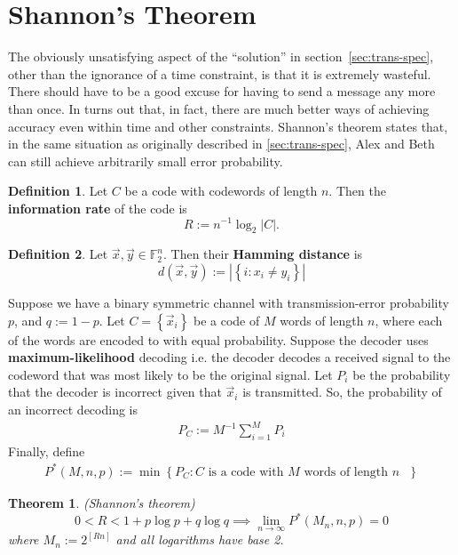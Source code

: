\documentclass{article}
\renewcommand{\tt}[1]{\text{ #1 }}
\newcommand{\F}{\mathbb{F}}
\renewcommand{\=}{\equiv}
\renewcommand{\i}{^{-1}}
\newcommand{\ra}{\rightarrow}
\newcommand{\set}[1]{\left\{ #1 \right\}}
\renewcommand{\v}{\vec}
\newcommand{\x}{{\v x}}
\newcommand{\y}{{\v y}}
\theoremstyle{plain}
\newtheorem{thm}{Theorem}[subsection]
\theoremstyle{definition}
\newtheorem{defn}{Definition}[subsection]
\begin{document}
\section{Shannon's Theorem}

The obviously unsatisfying aspect of the ``solution'' in section~\ref{sec:trans-spec}, other than the ignorance of a time constraint, is that it is extremely wasteful. There should have to be a good excuse for having to send a message any more than once.
In turns out that, in fact, there are much better ways of achieving accuracy even within time and other constraints.
Shannon's theorem states that, in the same situation as originally described in \ref{sec:trans-spec}, Alex and Beth can still achieve arbitrarily small error probability.

\begin{defn} \label{eq:defR}
Let $C$ be a code with codewords of length $n$. Then the \textbf{information rate} of the code is
$$ R := n\i \log_2 |C|. $$
\end{defn}

\begin{defn}
Let $\x, \y \in \F_2^n$. Then their \textbf{Hamming distance} is
$$ d(\x, \y) := |\set{ i : x_i \neq y_i }| $$

Suppose we have a binary symmetric channel with transmission-error probability $p$, and $q := 1 - p$.
Let $C = \set{ \x_i }$ be a code of $M$ words of length $n$, where each of the words are encoded to with equal probability.
Suppose the decoder uses \textbf{maximum-likelihood} decoding i.e. the decoder decodes a received signal to the codeword that was most likely to be the original signal.
Let $P_i$ be the probability that the decoder is incorrect given that $\x_i$ is transmitted.
So, the probability of an incorrect decoding is
\begin{align}
  P_C := M\i \sum_{i=1}^M P_i
\end{align}
Finally, define
\begin{align}
  P^*(M, n, p) := \min\set{ P_C : C \tt{is a code with $M$ words of length $n$} }
\end{align}
\end{defn}

\begin{thm}
  (Shannon's theorem)
  $$
  0 < R < 1 + p \log p + q \log q
  \implies \lim_{n \ra \infty} P^*(M_n, n, p) = 0
  $$
  where $M_n := 2^{[Rn]}$ and all logarithms have base 2.
\end{thm}
\end{document}
